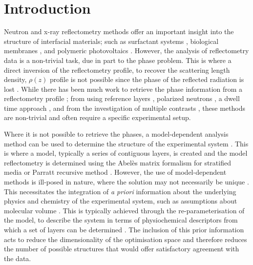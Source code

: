 \documentclass[
 reprint,
 superscriptaddress,
 amsmath,amssymb,
 aps,
]{revtex4-2}
\begin{document}
\maketitle

\section{\label{intro} Introduction}

Neutron and x-ray reflectometry methods offer an important insight into the structure of interfacial materials; such as surfactant systems \cite{mccluskey_bayesian_2019}, biological membranes \cite{clifton_self_2019}, and polymeric photovoltaics \cite{perez_determination_2019}. 
However, the analysis of reflectometry data is a non-trivial task, due in part to the phase problem. 
This is where a direct inversion of the reflectometry profile, to recover the scattering length density, $\rho(z)$ profile is not possible since the phase of the reflected radiation is lost \cite{majkrzak_exact_1995}.
While there has been much work to retrieve the phase information from a reflectometry profile \cite{kirby_phase_2012}; from using reference layers \cite{majkrzak_exact_1995,haan_retrieval_1995,majkrzak_phase_2003,nikova_novel_2019}, polarized neutrons \cite{leeb_determination_1998}, a dwell time approach \cite{fiedeldey_proposal_1992}, and from the investigation of multiple contrasts \cite{majkrzak_exact_1998,majkrzak_first_2000,majkrzak_phase_2003,koutsioubas_model_2019}, these methods are non-trivial and often require a specific experimental setup. 

Where it is not possible to retrieve the phases, a model-dependent analysis method can be used to determine the structure of the experimental system \cite{pedersen_analysis_1994,haan_genetic_1994,nelson_motofit_2006,lee_comparison_2007,gerelli_aurore_2016,gerelli_aurore_2016b,nelson_refnx_2019}.
This is where a model, typically a series of contiguous layers, is created and the model reflectometry is determined using the Abel\`{e}s matrix formalism for stratified media \cite{abeles_propagation_1948} or Parratt recursive method \cite{parratt_surface_1954}.
However, the use of model-dependent methods is ill-posed in nature, where the solution may not necessarily be unique \cite{klibanov_phaseless_1992,klibanov_use_1994}.
This necessitates the integration of \emph{a priori} information about the underlying physics and chemistry of the experimental system, such as assumptions about molecular volume \cite{waldie_localization_2018,campbell_structure_2018,mccluskey_bayesian_2019}. 
This is typically achieved through the re-parameterisation of the model, to describe the system in terms of physiochemical descriptors from which a set of layers can be determined \cite{schalke_structural_2000,heinrich_zooming_2014,heinrich_deuteration_2016}. 
The inclusion of this prior information acts to reduce the dimensionality of the optimisation space and therefore reduces the number of possible structures that would offer satisfactory agreement with the data. 
\end{document}
